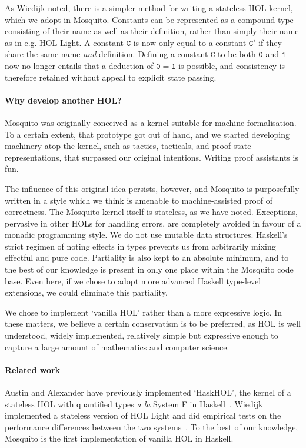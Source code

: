 \documentclass{llncs}
\newcommand{\mosquito}{Mosquito\xspace}
\begin{document}
As Wiedijk noted, there is a simpler method for writing a stateless HOL kernel, which we adopt in \mosquito.
Constants can be represented as a compound type consisting of their name as well as their definition, rather than simply their name as in e.g. HOL Light.
A constant $\mathtt{C}$ is now only equal to a constant $\mathtt{C'}$ if they share the same name \emph{and} definition.
Defining a constant $\mathtt{C}$ to be both $\mathtt{0}$ and $\mathtt{1}$ now no longer entails that a deduction of $\mathtt{0 = 1}$ is possible, and consistency is therefore retained without appeal to explicit state passing.
\paragraph{Why develop another HOL?}
\mosquito was originally conceived as a kernel suitable for machine formalisation.
To a certain extent, that prototype got out of hand, and we started developing machinery atop the kernel, such as tactics, tacticals, and proof state representations, that surpassed our original intentions.
Writing proof assistants is fun.

The influence of this original idea persists, however, and \mosquito is purposefully written in a style which we think is amenable to machine-assisted proof of correctness.
The \mosquito kernel itself is stateless, as we have noted.
Exceptions, pervasive in other HOLs for handling errors, are completely avoided in favour of a monadic programming style.
We do not use mutable data structures.
Haskell's strict regimen of noting effects in types prevents us from arbitrarily mixing effectful and pure code.
Partiality is also kept to an absolute minimum, and to the best of our knowledge is present in only one place within the \mosquito code base.
Even here, if we chose to adopt more advanced Haskell type-level extensions, we could eliminate this partiality.

We chose to implement `vanilla HOL' rather than a more expressive logic.
In these matters, we believe a certain conservatism is to be preferred, as HOL is well understood, widely implemented, relatively simple but expressive enough to capture a large amount of mathematics and computer science.
\paragraph{Related work}
Austin and Alexander have previously implemented `HaskHOL', the kernel of a stateless HOL with quantified types \emph{a la} System F in Haskell~\cite{austin:stateless:2013}.
Wiedijk implemented a stateless version of HOL Light and did empirical tests on the performance differences between the two systems~\cite{wiedijk:stateless:2011}.
To the best of our knowledge, \mosquito is the first implementation of vanilla HOL in Haskell.
\end{document}
